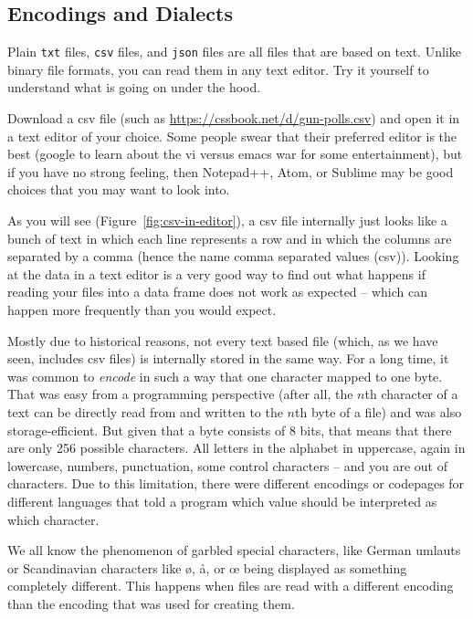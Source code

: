 \subsection{Encodings and Dialects} \label{sec:encodings}

Plain \verb|txt| files, \verb|csv| files, and \verb|json| files are all files that are based on text. Unlike binary file formats, you can read them in any text editor. Try it yourself to understand what is going on under the hood.

Download a csv file (such as \url{https://cssbook.net/d/gun-polls.csv})
and open it in a text editor of your choice. Some people swear that their preferred editor is the best (google to learn about the vi versus emacs war for some entertainment), but if you have no strong feeling, then Notepad++, Atom, or Sublime may be good choices that you may want to look into.

As you will see (Figure~\ref{fig:csv-in-editor}), a csv file internally just looks like a bunch of text in which each line represents a row and in which the columns are separated by a comma (hence the name comma separated values (csv)).
Looking at the data in a text editor is a very good way to find out what happens if reading your files into a data frame does not work as expected -- which can happen more frequently than you would expect.

Mostly due to historical reasons, not every text based file (which, as we have seen, includes csv files) is internally stored in the same way.
For a long time, it was common to \emph{encode} in such a way that one character mapped to one byte. That was easy from a programming perspective (after all, the $n$th character of a text can be directly  read from and written to the $n$th byte of a file) and was also storage-efficient. But given that a byte consists of 8 bits, that means that there are only 256 possible characters. All letters in the alphabet in uppercase, again in lowercase, numbers, punctuation, some control characters -- and you are out of characters. Due to this limitation, there were different encodings or codepages for different languages that told a program which value should be interpreted as which character.

We all know the phenomenon of garbled special characters, like German umlauts or Scandinavian characters like ø, å, or œ being displayed as something completely different. This happens when files are read with a different encoding than the encoding that was used for creating them.

